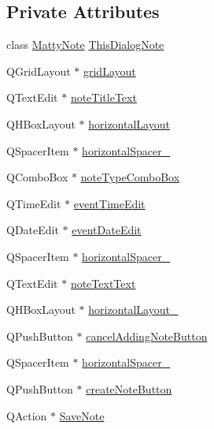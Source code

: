 \subsection*{Private Attributes}
\begin{DoxyCompactItemize}
\item 
class \hyperlink{class_matty_note}{Matty\+Note} \hyperlink{classadd_note_dialog_a3bd8efdf8721f0840894f3f5856c6a2b}{This\+Dialog\+Note}
\item 
Q\+Grid\+Layout $\ast$ \hyperlink{classadd_note_dialog_a5cf21dc93b1a1e8834b3d28231c7740c}{grid\+Layout}
\item 
Q\+Text\+Edit $\ast$ \hyperlink{classadd_note_dialog_a855ff9f5b161ebf50d68c0dcde9b4f96}{note\+Title\+Text}
\item 
Q\+H\+Box\+Layout $\ast$ \hyperlink{classadd_note_dialog_a638c98ded88e70f7bfffa919e7060fc7}{horizontal\+Layout}
\item 
Q\+Spacer\+Item $\ast$ \hyperlink{classadd_note_dialog_a3cd2ff7b167ce1d1b00e3be02f84faed}{horizontal\+Spacer\+\_}
\item 
Q\+Combo\+Box $\ast$ \hyperlink{classadd_note_dialog_a0cd0a5dbf53aee681524aaf6e656c2a2}{note\+Type\+Combo\+Box}
\item 
Q\+Time\+Edit $\ast$ \hyperlink{classadd_note_dialog_a3314f411cc74f37044c5a948f21f296a}{event\+Time\+Edit}
\item 
Q\+Date\+Edit $\ast$ \hyperlink{classadd_note_dialog_a2d2c5593b20338a9458fda2911bf6327}{event\+Date\+Edit}
\item 
Q\+Spacer\+Item $\ast$ \hyperlink{classadd_note_dialog_a1a8cd16077155d8468a3a966e6e07f4a}{horizontal\+Spacer\+\_}
\item 
Q\+Text\+Edit $\ast$ \hyperlink{classadd_note_dialog_adf81777e1ce0e4648e024426303c1e7a}{note\+Text\+Text}
\item 
Q\+H\+Box\+Layout $\ast$ \hyperlink{classadd_note_dialog_a6598c3700c6ab704a02f2b4c85b730bf}{horizontal\+Layout\+\_}
\item 
Q\+Push\+Button $\ast$ \hyperlink{classadd_note_dialog_a00e515c4cf26af2ed6adfa554f69e64a}{cancel\+Adding\+Note\+Button}
\item 
Q\+Spacer\+Item $\ast$ \hyperlink{classadd_note_dialog_afdb9febe317cbfc401e83355de338550}{horizontal\+Spacer\+\_}
\item 
Q\+Push\+Button $\ast$ \hyperlink{classadd_note_dialog_aed9ae97b6b2c51728e9b995b952a92c2}{create\+Note\+Button}
\item 
Q\+Action $\ast$ \hyperlink{classadd_note_dialog_a38a97c60ba07b1c2f606e7e9959829b5}{Save\+Note}

\end{DoxyCompactItemize}
